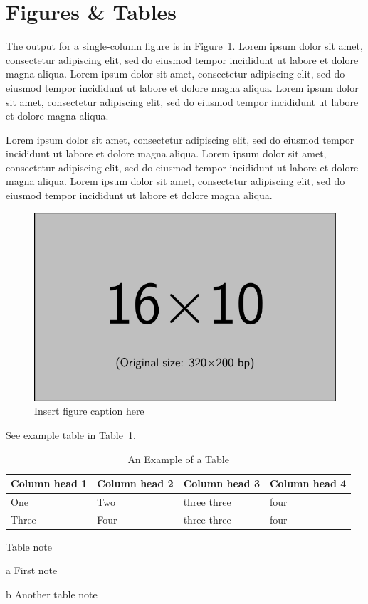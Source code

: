 
\section{Figures \& Tables}

The output for a single-column figure is in Figure~\ref{fig_sim}.  Lorem ipsum dolor sit amet, consectetur adipiscing elit, sed do eiusmod tempor incididunt ut labore et dolore magna aliqua. Lorem ipsum dolor sit amet, consectetur adipiscing elit, sed do eiusmod tempor incididunt ut labore et dolore magna aliqua. Lorem ipsum dolor sit amet, consectetur adipiscing elit, sed do eiusmod tempor incididunt ut labore et dolore magna aliqua. 

Lorem ipsum dolor sit amet, consectetur adipiscing elit, sed do eiusmod tempor incididunt ut labore et dolore magna aliqua. Lorem ipsum dolor sit amet, consectetur adipiscing elit, sed do eiusmod tempor incididunt ut labore et dolore magna aliqua. Lorem ipsum dolor sit amet, consectetur adipiscing elit, sed do eiusmod tempor incididunt ut labore et dolore magna aliqua. 



\begin{figure}[hbt!]
    \centering
    \includegraphics[width=0.75\linewidth]{images/example-image-16x10.pdf}
    \caption{Insert figure caption here}
    \label{fig_sim}
\end{figure}



See example table in Table~\ref{table_example}.

\begin{table}[hbt!]
\begin{threeparttable}
\caption{An Example of a Table}
\label{table_example}
\begin{tabular}{llll}
\toprule
\headrow Column head 1 & Column head 2  & Column head 3 & Column head 4\\
\midrule
One\tnote{a} & Two&three three &four\\ 
\midrule
Three & Four&three three\tnote{b} &four\\
\bottomrule
\end{tabular}
\begin{tablenotes}[hang]
\item[]Table note
\item[a]First note
\item[b]Another table note
\end{tablenotes}
\end{threeparttable}
\end{table}
